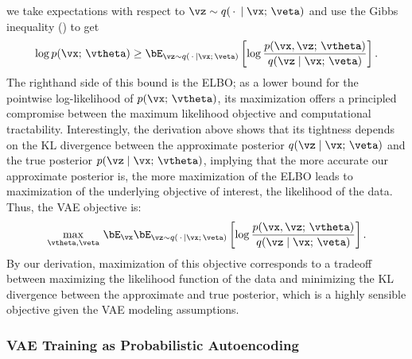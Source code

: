 \documentclass[../../book-main.tex]{subfiles}
\begin{document}
we take expectations with respect to $\vz \sim q(\,\cdot\, \mid
\vx;\, \veta)$ and
use the Gibbs inequality () to get
\begin{equation*}
\log p(\vx;\, \vtheta)
\geq
\bE_{\vz \sim q(\,\cdot\, \mid \vx ;\, \veta)} \left[
  \log \frac{p(\vx, \vz;\, \vtheta)}{q(\vz \mid \vx;\, \veta)}
\right].
\end{equation*}
The righthand side of this bound is the ELBO; as a lower bound for the pointwise
log-likelihood of $p(\vx;\, \vtheta)$, its maximization offers a
principled compromise
between the maximum likelihood objective and computational tractability.
Interestingly, the derivation above shows that its tightness depends on the KL
divergence between the approximate posterior $q(\vz \mid \vx;\, \veta)$ and the
true posterior $p(\vz \mid \vx;\, \vtheta)$, implying that the more accurate our
approximate posterior is, the more maximization of the ELBO leads to
maximization of the underlying objective of interest, the likelihood of the
data. Thus, the VAE objective is:
\begin{equation}\label{eq:elbo-objective}
\max_{\vtheta, \veta}\,
\bE_{\vx}
\bE_{\vz \sim q(\,\cdot\, \mid \vx ;\, \veta)} \left[
  \log \frac{p(\vx, \vz;\, \vtheta)}{q(\vz \mid \vx;\, \veta)}
\right].
\end{equation}
By our derivation, maximization of this objective corresponds to a tradeoff
between maximizing the likelihood function of the data and minimizing the KL
divergence between the approximate and true posterior, which is a highly
sensible objective given the VAE modeling assumptions.

\subsubsection{VAE Training as Probabilistic Autoencoding}
\end{document}
